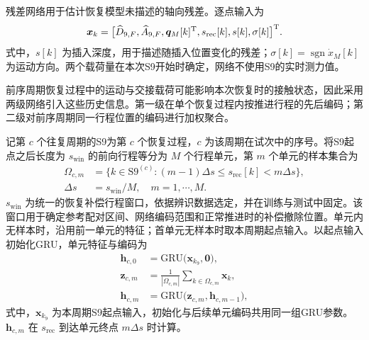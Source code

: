 \documentclass{JQR_LaTeX_Template-0507/JQRnew}
\begin{document}
残差网络用于估计恢复模型未描述的轴向残差。逐点输入为
\begin{equation}
\label{eq:gru-input}
\bm x_k=\big[\widehat D_{9,F},\widehat A_{9,F},
\bm q_M[k]^{\rm T},s_{\mathrm{rec}}[k],s[k],\sigma[k]\big]^{\rm T}.
\end{equation}
式中，$s[k]$ 为插入深度，用于描述随插入位置变化的残差；$\sigma[k]=\operatorname{sgn}\dot x_M[k]$ 为运动方向。两个载荷量在本次S9开始时确定，网络不使用S9的实时测力值。

前序周期恢复过程中的运动与交接载荷可能影响本次恢复时的接触状态，因此采用两级网络引入这些历史信息。第一级在单个恢复过程内按推进行程的先后编码；第二级对前序周期同一行程位置的编码进行加权聚合。

记第 $c$ 个往复周期的S9为第 $c$ 个恢复过程，$c$ 为该周期在试次中的序号。将S9起点之后长度为 $s_{\mathrm{win}}$ 的前向行程等分为 $M$ 个行程单元，第 $m$ 个单元的样本集合为
\begin{equation}
\label{eq:phase}
\begin{aligned}
\Omega_{c,m}&=\big\{k\in\mathrm{S9}^{(c)}:(m-1)\Delta s\le s_{\mathrm{rec}}[k]<m\Delta s\big\},\\
\Delta s&=s_{\mathrm{win}}/M,\quad m=1,\cdots,M.
\end{aligned}
\end{equation}
$s_{\mathrm{win}}$ 为统一的恢复补偿行程窗口，依据辨识数据选定，并在训练与测试中固定。该窗口用于确定参考配对区间、网络编码范围和正常推进时的补偿撤除位置。单元内无样本时，沿用前一单元的特征；首单元无样本时取本周期起点输入。以起点输入初始化GRU，单元特征与编码为
\begin{equation}
\label{eq:cell-encoder}
\begin{aligned}
\bm h_{c,0}&=\mathrm{GRU}\big(\bm x_{k_9},\bm 0\big),\\
\bm z_{c,m}&=\frac{1}{|\Omega_{c,m}|}\sum_{k\in\Omega_{c,m}}\bm x_k,\\
\bm h_{c,m}&=\mathrm{GRU}\big(\bm z_{c,m},\bm h_{c,m-1}\big),
\end{aligned}
\end{equation}
式中，$\bm x_{k_9}$ 为本周期S9起点输入，初始化与后续单元编码共用同一组GRU参数。$\bm h_{c,m}$ 在 $s_{\mathrm{rec}}$ 到达单元终点 $m\Delta s$ 时计算。
\end{document}
